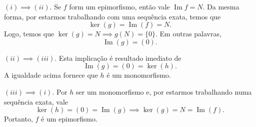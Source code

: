 \documentclass[11pt,twoside,a4paper]{article}
\DeclareMathOperator {\Imagem}{ Im }
\theoremstyle{remark}
\theoremstyle{definition}
\theoremstyle{plain}
\begin{document}
$(i) \implies (ii)$. Se $f$ form um epimorfismo, então vale $\Imagem{f} = N$. Da mesma forma, por estarmos
trabalhando com uma sequência exata, temos que
    \[\ker(g) = \Imagem(f) = N.\]
Logo, temos que $\ker(g) = N \implies g(N) = \{0\}$. Em outras palavras, 
    \[\Imagem(g) = (0). \]

$(ii) \implies (iii).$ Esta implicação é resultado imediato de
    \[ \Imagem(g) = (0) = \ker(h). \]
A igualdade acima fornece que $h$ é um monomorfismo.

$(iii) \implies (i)$. Por $h$ ser um monomorfismo e, por estarmos trabalhando numa sequência exata,
vale
    \[ \ker(h) = (0) = \Imagem(g) \implies \ker(g) = N = \Imagem(f).\]
Portanto, $f$ é um epimorfismo.
\end{document}
